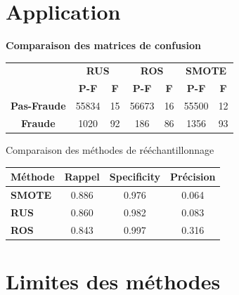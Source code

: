 \documentclass{beamer}
\begin{document}
\section{Application}

\begin{frame}

\centering
\textbf{Comparaison des matrices de confusion}

\vspace{0.4cm}

\begin{tabular}{c|cc|cc|cc}
 & \multicolumn{2}{c|}{\textbf{RUS}} & \multicolumn{2}{c|}{\textbf{ROS}} & \multicolumn{2}{c}{\textbf{SMOTE}} \\ 
 & \textbf{P-F} & \textbf{F} & \textbf{P-F} & \textbf{F} & \textbf{P-F} & \textbf{F} \\ \hline
\textbf{Pas-Fraude} & 55834 & 15 & 56673 & 16 & 55500 & 12 \\ 
\textbf{Fraude}     & 1020  & 92 & 186   & 86 & 1356  & 93 \\ 
\end{tabular}

\vspace{0.4cm}

\begin{block}{Comparaison des méthodes de rééchantillonnage}
\centering
\begin{tabular}{lccc}
\toprule
\textbf{Méthode} & \textbf{Rappel} & \textbf{Specificity} & \textbf{Précision} \\
\midrule
\textbf{SMOTE} & 0.886 & 0.976 & 0.064 \\
\textbf{RUS} & 0.860 & 0.982 & 0.083 \\
\textbf{ROS} & 0.843 & 0.997 & 0.316 \\
\bottomrule
\end{tabular}
\end{block}

\end{frame}

\section{Limites des méthodes}
\end{document}
